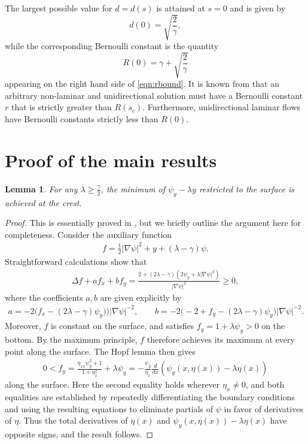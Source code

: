 \documentclass[pdflatex,sn-mathphys-num]{sn-jnl}%
\numberwithin{equation}{section}
\theoremstyle{thmstyleone}
\newtheorem{lemma}[theorem]{Lemma}
\newcommand{\abs}[2][]{#1\lvert #2 #1\rvert}
\begin{document}
The largest possible value for $d = d(s)$ is attained at $s = 0$ and is given by
\[
d(0) = \sqrt{\frac{2}{\gamma}},
\]
while the corresponding Bernoulli constant is the quantity
\[
R(0) = \gamma + \sqrt{\frac{2}{\gamma}}
\]
appearing on the right hand side of \eqref{eqn:rbound}.
It is known from \cite{Kozlov2015} that an arbitrary non-laminar and unidirectional solution must have a Bernoulli constant $r$ that is strictly greater than $R(s_c)$. Furthermore, unidirectional laminar flows have Bernoulli constants strictly less than $R(0)$.


\section{Proof of the main results}


\begin{lemma} \label{lem:crestmin} 
  For any $\lambda \ge \tfrac{\gamma}{2}$, the minimum of $\psi_y - \lambda y$ restricted to the surface is achieved at the crest.
\end{lemma}
\begin{proof}
  This is essentially proved in \cite[Proposition 3.3]{Kozlov2023}, but we briefly outline the argument here for completeness. Consider the auxiliary function 
  \begin{align*}
    f = \tfrac 12 \abs{\nabla\psi}^2 + y + (\lambda-\gamma)\psi.
  \end{align*}
  Straightforward calculations show that
  \begin{align*}
    \Delta f + af_x + bf_y = \frac{2+(2\lambda-\gamma)(2\psi_y + \lambda\abs{\nabla\psi}^2)}{\abs{\nabla\psi}^2} \ge 0,
  \end{align*}
  where the coefficients $a,b$ are given explicitly by
  \begin{align*}
    a = -2\big(f_x - (2\lambda-\gamma)\psi_y )\big)\abs{\nabla\psi}^{-2},
    \qquad 
    b = -2\bigl(-2 + f_y - (2\lambda-\gamma)\psi_y\big)\abs{\nabla\psi}^{-2}.
  \end{align*}
  Moreover, $f$ is constant on the surface, and satisfies $f_y = 1+\lambda \psi_y > 0$ on the bottom. By the maximum principle, $f$ therefore achieves its maximum at every point along the surface. The Hopf lemma then gives 
  \begin{align*}
    0 < f_y = \frac{\eta_{xx}\psi_y^2 + 1}{1+\eta_x^2} + \lambda \psi_y 
    = -\frac{\psi_y}{\eta_x} \frac d{dx} (\psi_y(x,\eta(x)) - \lambda \eta(x))
  \end{align*}
  along the surface. Here the second equality holds wherever $\eta_x \ne 0$, and both equalities are established by repeatedly differentiating the boundary conditions and using the resulting equations to eliminate partials of $\psi$ in favor of derivatives of $\eta$. Thus the total derivatives of $\eta(x)$ and $\psi_y(x,\eta(x))-\lambda\eta(x)$ have opposite signs, and the result follows.
\end{proof}
\end{document}
